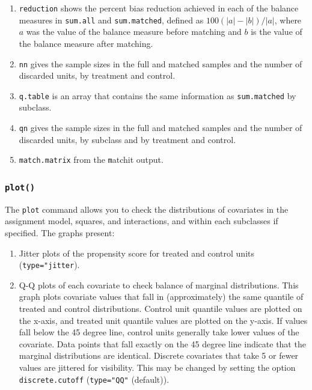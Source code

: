 \documentclass[oneside,letterpaper,titlepage]{article}
\begin{document}
\begin{enumerate}
\item \texttt{reduction} shows the percent bias reduction achieved in
  each of the balance measures in \texttt{sum.all} and
  \texttt{sum.matched}, defined as $100(|a|-|b|)/|a|$, where $a$ was
  the value of the balance measure before matching and $b$ is the
  value of the balance measure after matching.

\item \texttt{nn} gives the sample sizes in the full and matched
  samples and the number of discarded units, by treatment and control.
  
\item \texttt{q.table} is an array that contains the same information
  as \texttt{sum.matched} by subclass.
  
\item \texttt{qn} gives the sample sizes in the full and matched
  samples and the number of discarded units, by subclass and by
  treatment and control.
\item \texttt{match.matrix} from the {\texttt matchit} output.
\end{enumerate}

\subsubsection{{\tt plot()}}

The \texttt{plot} command allows you to check the distributions of
covariates in the assignment model, squares, and interactions, and
within each subclasses if specified.  The graphs present:
\begin{enumerate}
\item Jitter plots of the propensity score for treated and control
  units (\texttt{type="jitter}).
\item Q-Q plots of each covariate to check balance of marginal
  distributions.  This graph plots covariate values that fall in
  (approximately) the same quantile of treated and control
  distributions.  Control unit quantile values are plotted on the
  x-axis, and treated unit quantile values are plotted on the y-axis.
  If values fall below the 45 degree line, control units generally
  take lower values of the covariate.  Data points that fall exactly
  on the 45 degree line indicate that the marginal distributions are
  identical.  Discrete covariates that take 5 or fewer values are
  jittered for visibility.  This may be changed by setting the option
  \texttt{discrete.cutoff} (\texttt{type="QQ"} (default)).
\end{enumerate}
\end{document}
